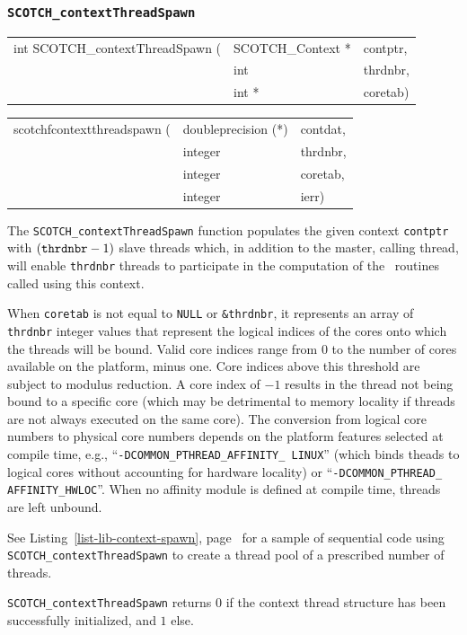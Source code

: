 \subsubsection{\texttt{SCOTCH\_contextThreadSpawn}}

\begin{itemize}
\progsyn

{\tt\begin{tabular}{l@{}ll}
int SCOTCH\_contextThreadSpawn ( & SCOTCH\_Context * & contptr, \\
                                 & int               & thrdnbr, \\
                                 & int *             & coretab)
\end{tabular}}

{\tt\begin{tabular}{l@{}ll}
scotchfcontextthreadspawn ( & doubleprecision (*) & contdat, \\
                            & integer             & thrdnbr, \\
                            & integer             & coretab, \\
                            & integer             & ierr)
\end{tabular}}

\progdes

The \texttt{SCOTCH\_contextThreadSpawn} function populates the given
context \texttt{contptr} with $(\mbox{\texttt{thrdnbr}} - 1)$ slave
threads which, in addition to the master, calling thread, will enable
\texttt{thrdnbr} threads to participate in the computation of the
\libscotch\ routines called using this context.

When \texttt{coretab} is not equal to \texttt{NULL} or
\texttt{\&thrdnbr}, it represents an array of \texttt{thrdnbr} integer
values that represent the logical indices of the cores onto which the
threads will be bound. Valid core indices range from $0$ to the number
of cores available on the platform, minus one. Core indices above this
threshold are subject to modulus reduction. A core index of $-1$
results in the thread not being bound to a specific core (which may be
detrimental to memory locality if threads are not always executed on
the same core). The conversion from logical core numbers to physical
core numbers depends on the platform features selected at compile
time, e.g., ``\texttt{-DCOMMON\_\lbt PTHREAD\_\lbt AFFINITY\_\lbt
LINUX}'' (which binds theads to logical cores without accounting
for hardware locality) or ``\texttt{-DCOMMON\_\lbt PTHREAD\_\lbt
AFFINITY\_\lbt HWLOC}''. When no affinity module is defined at compile
time, threads are left unbound.

See Listing~\ref{list-lib-context-spawn},
page~\pageref{list-lib-context-spawn} for a sample of sequential code
using \texttt{SCOTCH\_\lbt context\lbt Thread\lbt Spawn} to create a
thread pool of a prescribed number of threads.

\progret

\texttt{SCOTCH\_contextThreadSpawn} returns $0$ if the context
thread structure has been successfully initialized, and $1$ else.
\end{itemize}

